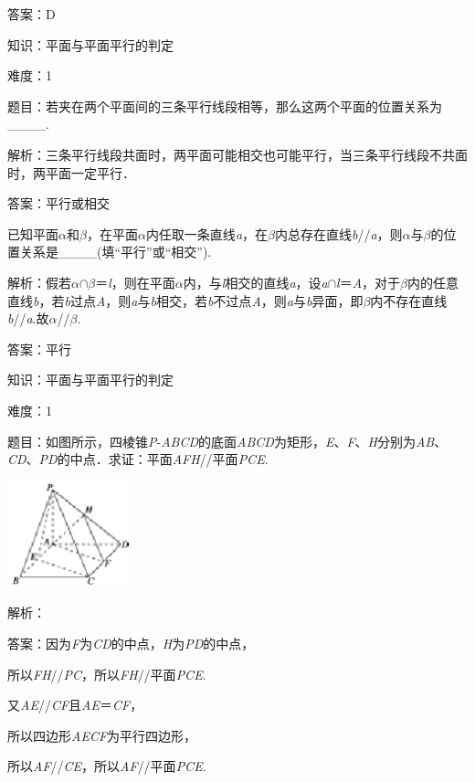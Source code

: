 \documentclass{article} %
\begin{document}
答案：D

知识：平面与平面平行的判定

难度：1

题目：若夹在两个平面间的三条平行线段相等，那么这两个平面的位置关系为\_\_\_\_.

解析：三条平行线段共面时，两平面可能相交也可能平行，当三条平行线段不共面时，两平面一定平行．

答案：平行或相交

已知平面\textit{$\alpha$}和\textit{$\beta$}，在平面\textit{$\alpha$}内任取一条直线\textit{a}，在\textit{$\beta$}内总存在直线\textit{b}//\textit{a}，则\textit{$\alpha$}与\textit{$\beta$}的位置关系是\_\_\_\_(填``平行''或``相交'').

解析：假若\textit{$\alpha$}$\mathrm{\cap}$\textit{$\beta$}＝\textit{l}，则在平面\textit{$\alpha$}内，与\textit{l}相交的直线\textit{a}，设\textit{a}$\mathrm{\cap}$\textit{l}＝\textit{A}，对于\textit{$\beta$}内的任意直线\textit{b}，若\textit{b}过点\textit{A}，则\textit{a}与\textit{b}相交，若\textit{b}不过点\textit{A}，则\textit{a}与\textit{b}异面，即\textit{$\beta$}内不存在直线\textit{b}//\textit{a}.故\textit{$\alpha$}//\textit{$\beta$}.

答案：平行

知识：平面与平面平行的判定

难度：1

题目：如图所示，四棱锥\textit{P}-\textit{ABCD}的底面\textit{ABCD}为矩形，\textit{E}、\textit{F}、\textit{H}分别为\textit{AB}、\textit{CD}、\textit{PD}的中点．求证：平面\textit{AFH}//平面\textit{PCE}.

\includegraphics*[width=1.43in, height=1.21in, keepaspectratio=false]{image149}

解析：

答案：因为\textit{F}为\textit{CD}的中点，\textit{H}为\textit{PD}的中点，

所以\textit{FH}//\textit{PC}，所以\textit{FH}//平面\textit{PCE}.

又\textit{AE}//\textit{CF}且\textit{AE}＝\textit{CF}，

所以四边形\textit{AECF}为平行四边形，

所以\textit{AF}//\textit{CE}，所以\textit{AF}//平面\textit{PCE}.
\end{document}

